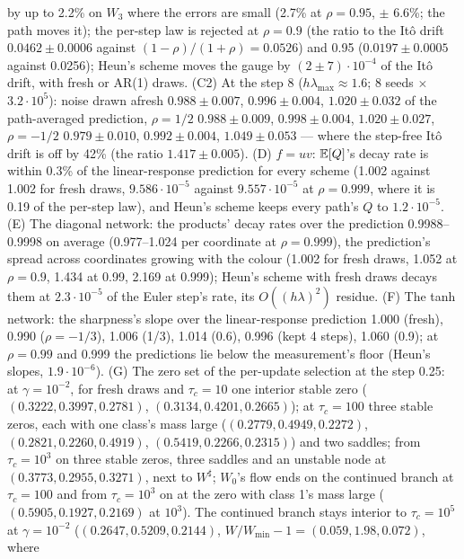 \begin{sloppypar}
by up to 2.2\% on $W_3$ where the errors are small (2.7\% at $\rho = 0.95$, $\pm$ 6.6\%; the path moves it); the per-step
law is rejected at $\rho = 0.9$ (the ratio to the It\^o drift $0.0462\pm0.0006$ against
$(1 - \rho)/(1 + \rho) = 0.0526$) and 0.95 ($0.0197\pm0.0005$ against 0.0256); Heun's scheme moves the gauge by
$(2\pm7)\cdot10^{-4}$ of the It\^o drift, with fresh or AR(1) draws. (C2) At the step 8 ($h\lambda_{\max}\approx1.6$; 8
seeds $\times$ $3.2\cdot10^5$): noise drawn afresh $0.988\pm0.007$, $0.996\pm0.004$, $1.020\pm0.032$ of the
path-averaged prediction, $\rho = 1/2$ $0.988\pm0.009$, $0.998\pm0.004$, $1.020\pm0.027$, $\rho = -1/2$
$0.979\pm0.010$, $0.992\pm0.004$, $1.049\pm0.053$ --- where the step-free It\^o drift is off by 42\% (the ratio
$1.417\pm0.005$). (D) $f = uv$: $\mathbb{E}[Q]$'s decay rate is within 0.3\% of the linear-response prediction for every scheme
(1.002 against 1.002 for fresh draws, $9.586\cdot10^{-5}$ against $9.557\cdot10^{-5}$ at $\rho = 0.999$, where it is
0.19 of the per-step law), and Heun's scheme keeps every path's $Q$ to $1.2\cdot10^{-5}$. (E) The diagonal network: the
products' decay rates over the prediction 0.9988--0.9998 on average (0.977--1.024 per coordinate at $\rho = 0.999$),
the prediction's spread across coordinates growing with the colour (1.002 for fresh draws, 1.052 at $\rho = 0.9$, 1.434
at 0.99, 2.169 at 0.999); Heun's scheme with fresh draws decays them at $2.3\cdot10^{-5}$ of the Euler step's rate, its
$O((h\lambda)^2)$ residue. (F) The tanh network: the sharpness's slope over the linear-response prediction 1.000
(fresh), 0.990 ($\rho = -1/3$), 1.006 (1/3), 1.014 (0.6), 0.996 (kept 4 steps), 1.060 (0.9); at $\rho = 0.99$ and
0.999 the predictions lie below the measurement's floor (Heun's slopes, $1.9\cdot10^{-6}$). (G) The zero set of the
per-update selection at the step 0.25: at $\gamma = 10^{-2}$, for fresh draws and $\tau_c = 10$ one interior stable zero
($(0.3222, 0.3997, 0.2781)$, $(0.3134, 0.4201, 0.2665)$); at $\tau_c = 100$ three stable zeros, each with one class's
mass large ($(0.2779, 0.4949, 0.2272)$, $(0.2821, 0.2260, 0.4919)$, $(0.5419, 0.2266, 0.2315)$) and two saddles; from
$\tau_c = 10^3$ on three stable zeros, three saddles and an unstable node at $(0.3773, 0.2955, 0.3271)$, next to
$W^\sharp$; $W_0$'s flow ends on the continued branch at $\tau_c = 100$ and from $\tau_c = 10^3$ on at the zero with
class 1's mass large ($(0.5905, 0.1927, 0.2169)$ at $10^3$). The continued branch stays interior to $\tau_c = 10^5$ at
$\gamma = 10^{-2}$ ($(0.2647, 0.5209, 0.2144)$, $W/W_{\min} - 1 = (0.059, 1.98, 0.072)$, where

\end{sloppypar}
